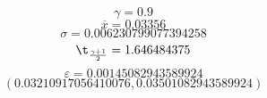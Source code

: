 $$ \gamma = 0.9 $$
$$ \overline{x} = 0.03356 $$
$$ \sigma = 0.006230799077394258 $$
$$ \t_{\frac{\gamma+1}{2}} = 1.646484375 $$
$$ \varepsilon = 0.00145082943589924 $$
$$ (0.03210917056410076, 0.03501082943589924) $$
